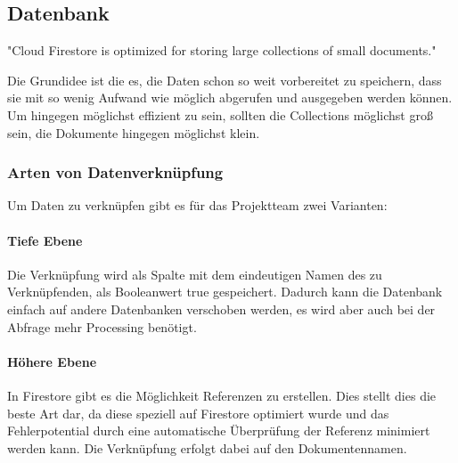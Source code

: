 \subsection{Datenbank}

"Cloud Firestore is optimized for storing large collections of small documents."\cite{cloud_firestore_datenmodell}

Die Grundidee ist die es, die Daten schon so weit vorbereitet zu speichern, dass sie mit so wenig Aufwand wie möglich abgerufen und ausgegeben werden können. Um hingegen möglichst effizient zu sein, sollten die Collections möglichst groß sein, die Dokumente hingegen möglichst klein.

\subsubsection{Arten von Datenverknüpfung}

Um Daten zu verknüpfen gibt es für das Projektteam zwei Varianten:

\paragraph{Tiefe Ebene}
Die Verknüpfung wird als Spalte mit dem eindeutigen Namen des zu Verknüpfenden, als Booleanwert true gespeichert.  Dadurch kann die Datenbank einfach auf andere Datenbanken verschoben werden, es wird aber auch bei der Abfrage mehr Processing benötigt.

\paragraph{Höhere Ebene}
In Firestore gibt es die Möglichkeit Referenzen zu erstellen. Dies stellt dies die beste Art dar, da diese speziell auf Firestore optimiert wurde und das Fehlerpotential durch eine automatische Überprüfung der Referenz minimiert werden kann. Die Verknüpfung erfolgt dabei auf den Dokumentennamen.
